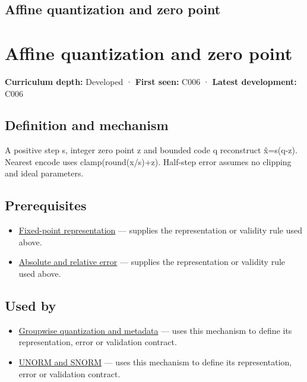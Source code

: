 \hypertarget{appendix-d5da3eaabaef}{}
\section*{Affine quantization and zero point}
\chapter{Affine quantization and zero point}\label{appendix-d5da3eaabaef-affine-quantization-and-zero-point}

\textbf{Curriculum depth:} Developed · \textbf{First seen:} C006 · \textbf{Latest development:} C006

\section{Definition and mechanism}\label{appendix-d5da3eaabaef-definition-and-mechanism}

A positive step s, integer zero point z and bounded code q reconstruct x̂=s(q-z). Nearest encode uses clamp(round(x/s)+z). Half-step error assumes no clipping and ideal parameters.

\section{Prerequisites}\label{appendix-d5da3eaabaef-prerequisites}

\begin{itemize}
\tightlist
\item
  \hyperref[appendix-1d0dbe8924cc]{Fixed-point representation} --- supplies the representation or validity rule used above.
\item
  \hyperref[appendix-3ae74e89b4e6]{Absolute and relative error} --- supplies the representation or validity rule used above.
\end{itemize}

\section{Used by}\label{appendix-d5da3eaabaef-used-by}

\begin{itemize}
\tightlist
\item
  \hyperref[appendix-638204c40e8b]{Groupwise quantization and metadata} --- uses this mechanism to define its representation, error or validation contract.
\item
  \hyperref[appendix-b2402c453dac]{UNORM and SNORM} --- uses this mechanism to define its representation, error or validation contract.
\end{itemize}


